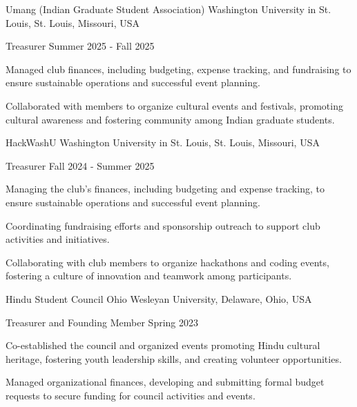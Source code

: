\documentclass[10pt, letterpaper]{article}
\begin{document}
\begin{leadershipentry}
  {Umang (Indian Graduate Student Association)} %
  {Washington University in St. Louis, St. Louis, Missouri, USA} %
  \begin{positionentry}
    {Treasurer} %
    {Summer 2025 - Fall 2025} %
    \item Managed club finances, including budgeting, expense tracking, and fundraising to ensure sustainable operations and successful event planning.
    \item Collaborated with members to organize cultural events and festivals, promoting cultural awareness and fostering community among Indian graduate students.
  \end{positionentry}
\end{leadershipentry}

\begin{leadershipentry}
  {HackWashU} %
  {Washington University in St. Louis, St. Louis, Missouri, USA} %
  \begin{positionentry}
    {Treasurer} %
    {Fall 2024 - Summer 2025} %
    \item Managing the club's finances, including budgeting and expense tracking, to ensure sustainable operations and successful event planning.
    \item Coordinating fundraising efforts and sponsorship outreach to support club activities and initiatives.
    \item Collaborating with club members to organize hackathons and coding events, fostering a culture of innovation and teamwork among participants.
  \end{positionentry}
\end{leadershipentry}

\begin{leadershipentry}
  {Hindu Student Council} %
  {Ohio Wesleyan University, Delaware, Ohio, USA} %
  \begin{positionentry}
    {Treasurer and Founding Member} %
    {Spring 2023} %
    \item Co-established the council and organized events promoting Hindu cultural heritage, fostering youth leadership skills, and creating volunteer opportunities.
    \item Managed organizational finances, developing and submitting formal budget requests to secure funding for council activities and events.
  \end{positionentry}
\end{leadershipentry}
\end{document}
